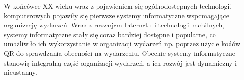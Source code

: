 W końcówce XX wieku wraz z pojawieniem się ogólnodostępnych technologii komputerowych pojawiły się pierwsze systemy informatyczne wspomagające organizację wydarzeń. Wraz z rozwojem Internetu i technologii mobilnych, systemy informatyczne stały się coraz bardziej dostępne i popularne, co umożliwiło ich wykorzystanie w organizacji wydarzeń np. poprzez użycie kodów QR do sprawdzania obecności na wydarzeniu. Obecnie systemy informatyczne stanowią integralną część organizacji wydarzeń, a ich rozwój jest dynamiczny i nieustanny.